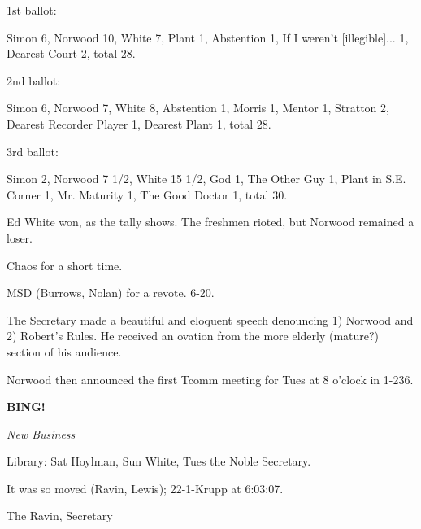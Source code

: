 \documentclass[12pt]{article}
\newcommand{\bing}{{\bf BING!} }
\newcommand{\goto}[1]{\bing \vskip 12pt \centerline{{\em{#1}}}}
\begin{document}
1st ballot:

Simon 6, Norwood 10, White 7, Plant 1, Abstention 1, If I weren't [illegible]... 1, Dearest Court 2, total 28.

2nd ballot:

Simon 6, Norwood 7, White 8, Abstention 1, Morris 1, Mentor 1, Stratton 2, Dearest Recorder Player 1, Dearest Plant 1, total 28.

3rd ballot:

Simon 2, Norwood 7 1/2, White 15 1/2, God 1, The Other Guy 1, Plant in S.E. Corner 1, Mr. Maturity 1, The Good Doctor 1, total 30.

Ed White won, as the tally shows. The freshmen rioted, but Norwood remained a loser.

Chaos for a short time.

MSD (Burrows, Nolan) for a revote. 6-20.

The Secretary made a beautiful and eloquent speech denouncing 1) Norwood and 2) Robert's Rules. He received an ovation from the more elderly (mature?) section of his audience.

Norwood then announced the first Tcomm meeting for Tues at 8 o'clock in 1-236.

\goto{New Business}

Library: Sat Hoylman, Sun White, Tues the Noble Secretary.

It was so moved (Ravin, Lewis); 22-1-Krupp at 6:03:07.

\vspace{12pt}

\centerline{The Ravin, Secretary}
\end{document}
